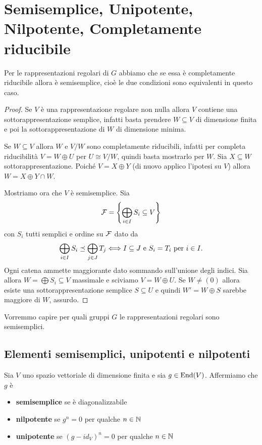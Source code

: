 \chapter{Semisemplice, Unipotente, Nilpotente, Completamente riducibile}

\begin{proposition}\label{PrSemisempliceEquivaleCompletamenteRiducibile}
Per le rappresentazioni regolari di $G$ abbiamo che se essa \`e completamente riducibile allora \`e semisemplice, cio\`e le due condizioni sono equivalenti in questo caso.
\end{proposition}
\begin{proof}
Se $V$ \`e una rappresentazione regolare non nulla allora $V$ contiene una sottorappresentazione semplice, infatti basta prendere $W\subseteq V$ di dimensione finita e poi la sottorappresentazione di $W$ di dimensione minima.

Se $W\subseteq V$ allora $W$ e $V/W$ sono completamente riducibili, infatti per completa riducibilit\`a $V=W\oplus U$ per $U\cong V/W$, quindi basta mostrarlo per $W$. Sia $X\subseteq W$ sottorappresentazione. Poich\'e $V=X\oplus Y$ (di nuovo applico l'ipotesi su $V$) allora $W=X\oplus Y\cap W$.

Mostriamo ora che $V$ \`e semisemplice. Sia
\[\mathcal{F}=\left\{{\bigoplus_{i\in I}S_i\subseteq V}\right\}\]
con $S_i$ tutti semplici e ordine su $\mathcal{F}$ dato da
\[\bigoplus_{i\in I}S_i\preceq \bigoplus_{j\in J}T_j\Longleftrightarrow I\subseteq J\text{ e }S_i=T_i\text{ per $i\in I$}.\]
Ogni catena ammette maggiorante dato sommando sull'unione degli indici. Sia allora $W=\bigoplus S_i\subseteq V$ massimale e sciviamo $V=W\oplus U$. Se $W\neq (0)$ allora esiste una sottorappresentazione semplice $S\subseteq U$ e quindi $W'=W\oplus S$ sarebbe maggiore di $W$, assurdo.
\end{proof}


Vorremmo capire per quali gruppi $G$ le rappresentazioni regolari sono semisemplici.

\section{Elementi semisemplici, unipotenti e nilpotenti}
\begin{definition}
Sia $V$ uno spazio vettoriale di dimensione finita e sia $g\in\operatorname{End}(V)$. Affermiamo che $g$ \`e
\begin{itemize}
    \item \textbf{semisemplice} se \`e diagonalizzabile
    \item \textbf{nilpotente} se $g^n=0$ per qualche $n\in\mathbb{N}$
    \item \textbf{unipotente} se $(g-id_V)^n=0$ per qualche $n\in\mathbb{N}$
\end{itemize}
\end{definition}


